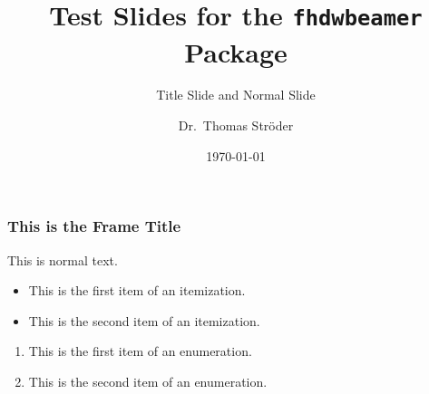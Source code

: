 \documentclass{beamer}
\title{Test Slides for the \texttt{fhdwbeamer} Package}
\subtitle{Title Slide and Normal Slide}
\author{Dr.\ Thomas Ströder}
\date{\today}
\institute{FHDW}
\begin{document}
\titlepage

\begin{frame}
\frametitle{This is the Frame Title}
\centering
This is normal text.
\begin{itemize}
\item This is the first item of an itemization.
\item This is the second item of an itemization.
\end{itemize}
\begin{enumerate}
\item This is the first item of an enumeration.
\item This is the second item of an enumeration.
\end{enumerate}
\end{frame}
\end{document}

